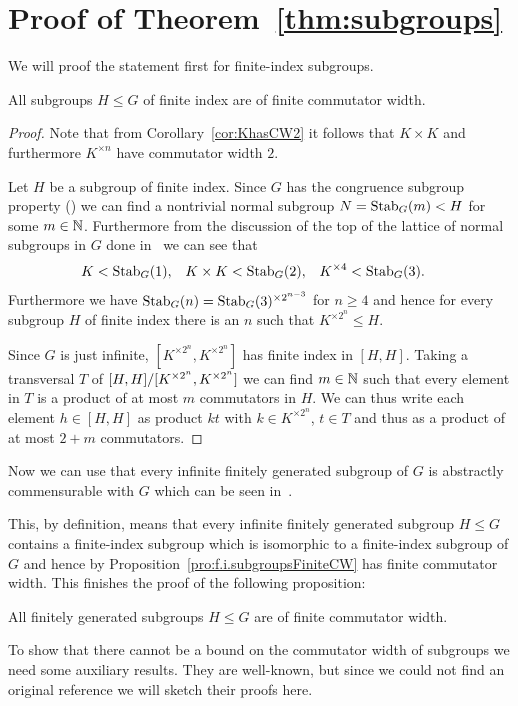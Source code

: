 \documentclass[a4paper,11pt]{amsart}
\begin{document}
\section{Proof of Theorem~\ref{thm:subgroups}}
We will proof the statement first for finite-index subgroups. 
\begin{pro}\label{pro:f.i.subgroupsFiniteCW}
  All subgroups $H \leq G$ of finite index are of finite commutator width.
\end{pro}
\begin{proof}
 Note that from Corollary~\ref{cor:KhasCW2} it follows that $K\times K$ and furthermore 
 $K^{\times n}$ have commutator width $2$. 
 
 Let $H$ be a subgroup of finite index. Since $G$ has the congruence subgroup property
 (\cite{Bartholdi-Grigorchuk:parabolicSubgroups}) we can find a nontrivial normal subgroup $N=\operatorname{Stab}_G(m)<H$
 for some $m\in\mathbb{N}$. Furthermore from the discussion of the top of the lattice of normal subgroups
 in $G$ done in~\cite{Bartholdi-Grigorchuk:parabolicSubgroups} we can see that 
 \begin{align*}
  K&<\operatorname{Stab}_G(1), & K\times K&<\operatorname{Stab}_G(2), & K^{\times 4}&<\operatorname{Stab}_G(3).
 \end{align*}
 Furthermore we have $\operatorname{Stab}_G(n)=\operatorname{Stab}_G(3)^{\times 2^{n-3}}$ for $n\geq 4$ and hence for every 
 subgroup $H$ of finite index there is an $n$ such that $K^{\times 2^n}\leq H$.
  
  Since $G$ is just infinite, $[K^{\times2^n},K^{\times2^n}]$ has finite index in $[H,H]$.
  Taking a transversal $T$ of ${[H,H]/[K^{\times2^n},K^{\times2^n}]}$ we can find 
  $m\in \mathbb{N}$ such that every element in $T$ is a product of at most $m$ commutators in $H$.
  We can thus write each element $h\in [H,H]$ as product $kt$ with $k\in K^{\times 2^n}$, 
  $t\in T$ and thus as a product of at most $2+m$ commutators.  
\end{proof}
Now we can use that every infinite finitely generated subgroup of $G$ is 
abstractly commensurable with $G$ which can be seen in~\cite[Theorem~1]{Grigorchuk-Wilson:Commensurability}.

This, by definition, means that every infinite finitely generated subgroup $H\leq G$ 
contains a finite-index subgroup which is isomorphic to a finite-index subgroup
of $G$ and hence by Proposition~\ref{pro:f.i.subgroupsFiniteCW} has finite
commutator width. This finishes the proof of the following proposition:
\begin{pro} \label{pro:fgsubgroupcw}
   All finitely generated subgroups $H \leq G$ are of finite commutator width.
\end{pro}
To show that there cannot be a bound on the commutator width of subgroups
we need some auxiliary results. They are well-known, but since we could not find an original reference we will
sketch their proofs here.
\end{document}
